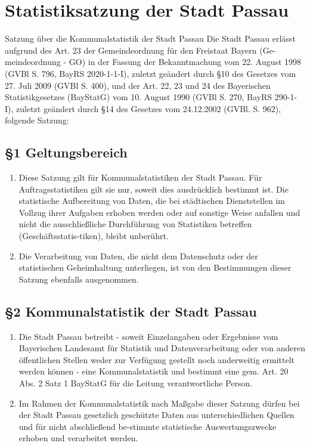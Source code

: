 \chapter{Statistiksatzung der Stadt Passau}{Satzung über die Kommunalstatistik der Stadt Passau}
  Die Stadt Passau erlässt aufgrund des Art. 23 der Gemeindeordnung für den Freistaat Bayern (Ge-meindeordnung - GO) in der Fassung der Bekanntmachung vom 22. August 1998 (GVBl S. 796, BayRS 2020-1-1-I), zuletzt geändert durch \S 10 des Gesetzes vom 27. Juli 2009 (GVBl S. 400), und der Art. 22, 23 und 24 des Bayerischen Statistikgesetzes (BayStatG) vom 10. August 1990 (GVBl S. 270, BayRS 290-1-I), zuletzt geändert durch \S 14 des Gesetzes vom 24.12.2002 (GVBl. S. 962), folgende Satzung:
  \section{\S1 Geltungsbereich}
    \begin{enumerate}[label=(\arabic*)]
      \item Diese Satzung gilt für Kommunalstatistiken der Stadt Passau. Für Auftragsstatistiken gilt sie nur, soweit dies ausdrücklich bestimmt ist. Die statistische Aufbereitung von Daten, die bei städtischen Dienststellen im Vollzug ihrer Aufgaben erhoben werden oder auf sonstige Weise anfallen und nicht die ausschließliche Durchführung von Statistiken betreffen (Geschäftsstatis-tiken), bleibt unberührt. 
      \item Die Verarbeitung von Daten, die nicht dem Datenschutz oder der statistischen Geheimhaltung unterliegen, ist von den Bestimmungen dieser Satzung ebenfalls ausgenommen. 
    \end{enumerate}

  \section{\S2 Kommunalstatistik der Stadt Passau}
    \begin{enumerate}[label=(\arabic*)]
      \item Die Stadt Passau betreibt - soweit Einzelangaben oder Ergebnisse vom Bayerischen Landesamt für Statistik und Datenverarbeitung oder von anderen öffentlichen Stellen weder zur Verfügung gestellt noch anderweitig ermittelt werden können - eine Kommunalstatistik und bestimmt eine gem. Art. 20 Abs. 2 Satz 1 BayStatG für die Leitung verantwortliche Person.
      \item Im Rahmen der Kommunalstatistik nach Maßgabe dieser Satzung dürfen bei der Stadt Passau gesetzlich geschützte Daten aus unterschiedlichen Quellen und für nicht abschließend be-stimmte statistische Auswertungszwecke erhoben und verarbeitet werden.
    \end{enumerate}
 
